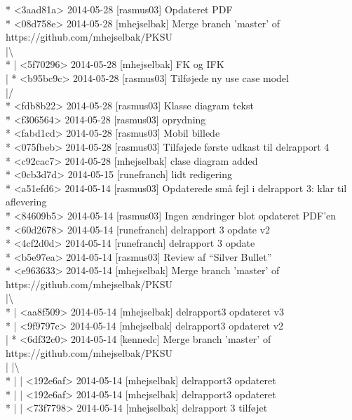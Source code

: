 \documentclass[12pt]{article}
\begin{document}
* <3aad81a> 2014-05-28 [rasmus03]  Opdateret PDF\\
*   <08d758e> 2014-05-28 [mhejselbak]  Merge branch 'master' of https://github.com/mhejselbak/PKSU\\
|\textbackslash \\ 
* | <5f70296> 2014-05-28 [mhejselbak]  FK og IFK\\
| * <b95bc9c> 2014-05-28 [rasmus03]  Tilføjede ny use case model \\
|/  \\
* <fdb8b22> 2014-05-28 [rasmus03]  Klasse diagram tekst\\
* <f306564> 2014-05-28 [rasmus03]  oprydning\\
* <fabd1cd> 2014-05-28 [rasmus03]  Mobil billede\\
* <075fbeb> 2014-05-28 [rasmus03]  Tilføjede første udkast til delrapport 4\\
* <c92cac7> 2014-05-28 [mhejselbak]  clase diagram added\\
* <0cb3d7d> 2014-05-15 [runefranch]  lidt redigering\\
* <a51efd6> 2014-05-14 [rasmus03]  Opdaterede små fejl i delrapport 3: klar til aflevering \\
* <84609b5> 2014-05-14 [rasmus03]  Ingen ændringer blot opdateret PDF’en \\
* <60d2678> 2014-05-14 [runefranch]  delrapport 3 opdate v2 \\
* <4cf2d0d> 2014-05-14 [runefranch]  delrapport 3 opdate\\
* <b5e97ea> 2014-05-14 [rasmus03]  Review af “Silver Bullet” \\
*   <e963633> 2014-05-14 [mhejselbak]  Merge branch 'master' of https://github.com/mhejselbak/PKSU\\
|\textbackslash \\
* | <aa8f509> 2014-05-14 [mhejselbak]  delrapport3 opdateret v3\\
* | <9f9797c> 2014-05-14 [mhejselbak]  delrapport3 opdateret v2\\
| *   <6df32c0> 2014-05-14 [kennedc]  Merge branch 'master' of https://github.com/mhejselbak/PKSU\\
| |\textbackslash  \\
* | | <192e6af> 2014-05-14 [mhejselbak]  delrapport3 opdateret \\
* | | <192e6af> 2014-05-14 [mhejselbak]  delrapport3 opdateret \\
* | | <73f7798> 2014-05-14 [mhejselbak]  delrapport 3 tilføjet\\
\end{document}
